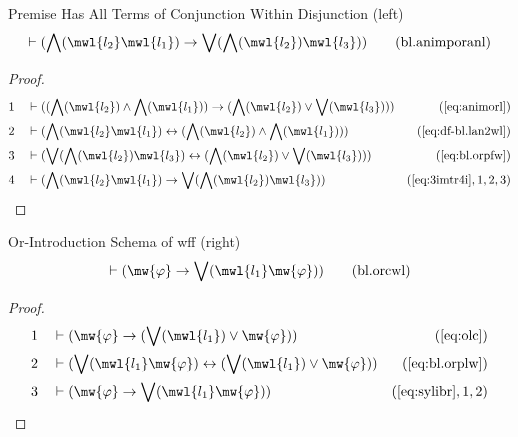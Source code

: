 \begin{lemma} {Premise Has All Terms of Conjunction
Within Disjunction (left)}
\begin{align}
\vdash ( \bigwedge( \mwl{l_2} \mwl{l_1} ) \rightarrow \bigvee( \bigwedge(
    \mwl{l_2} ) \mwl{l_3} ) )\label{eq:bl.animporanl}\tag{bl.animporanl}
\end{align}
\end{lemma}


\begin{proof}
\begin{align}
  1 &&  & \vdash ( ( \bigwedge( \mwl{l_2} ) \wedge \bigwedge( \mwl{l_1} ) )
     \rightarrow ( \bigwedge( \mwl{l_2} ) \vee \bigvee(
     \mwl{l_3} ) ) )&(\mbox{\ref{eq:animorl}})\notag
  \\ 2 &&  & \vdash ( \bigwedge( \mwl{l_2} \mwl{l_1} ) \leftrightarrow (
     \bigwedge( \mwl{l_2} ) \wedge \bigwedge( \mwl{l_1} )
     ) )&(\mbox{\ref{eq:df-bl.lan2wl}})\notag
  \\ 3 &&  & \vdash ( \bigvee( \bigwedge( \mwl{l_2} ) \mwl{l_3} )
     \leftrightarrow ( \bigwedge( \mwl{l_2} ) \vee
     \bigvee( \mwl{l_3} ) )
     )&(\mbox{\ref{eq:bl.orpfw}})\notag
  \\ 4 &&  & \vdash ( \bigwedge( \mwl{l_2} \mwl{l_1} ) \rightarrow \bigvee(
     \bigwedge( \mwl{l_2} ) \mwl{l_3} )
     )&(\mbox{\ref{eq:3imtr4i}},1,2,3)\notag
\end{align}
\end{proof}

\begin{lemma} {Or-Introduction Schema of wff (right)}
\begin{align}
\vdash ( \mw{\varphi} \rightarrow \bigvee( \mwl{l_1} \mw{\varphi} )
    )\label{eq:bl.orcwl}\tag{bl.orcwl}
\end{align}
\end{lemma}


\begin{proof}
\begin{align}
  1 &&  & \vdash ( \mw{\varphi} \rightarrow ( \bigvee( \mwl{l_1} ) \vee
     \mw{\varphi} ) )&(\mbox{\ref{eq:olc}})\notag
  \\ 2 &&  & \vdash ( \bigvee( \mwl{l_1} \mw{\varphi} ) \leftrightarrow (
     \bigvee( \mwl{l_1} ) \vee \mw{\varphi} )
     )&(\mbox{\ref{eq:bl.orplw}})\notag
  \\ 3 &&  & \vdash ( \mw{\varphi} \rightarrow \bigvee( \mwl{l_1} \mw{\varphi}
     ) )&(\mbox{\ref{eq:sylibr}},1,2)\notag
\end{align}
\end{proof}

